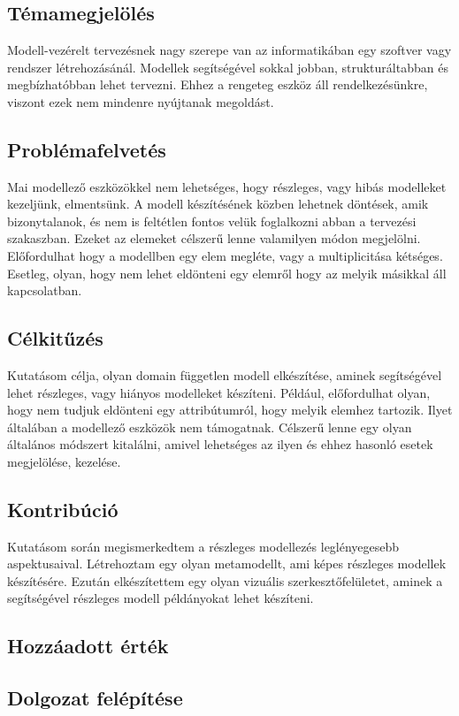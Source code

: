 \chapter{\bevezetes}

\section{Témamegjelölés}
Modell-vezérelt tervezésnek nagy szerepe van az informatikában egy szoftver vagy rendszer létrehozásánál. Modellek segítségével sokkal jobban, strukturáltabban és megbízhatóbban lehet tervezni. Ehhez a rengeteg eszköz áll rendelkezésünkre, viszont ezek nem mindenre nyújtanak megoldást.
\section{Problémafelvetés}
Mai modellező eszközökkel nem lehetséges, hogy részleges, vagy hibás modelleket kezeljünk, elmentsünk. A modell készítésének közben lehetnek döntések, amik bizonytalanok, és nem is feltétlen fontos velük foglalkozni abban a tervezési szakaszban. Ezeket az elemeket célszerű lenne valamilyen módon megjelölni. Előfordulhat hogy a modellben egy elem megléte, vagy a multiplicitása kétséges. Esetleg, olyan, hogy nem lehet eldönteni egy elemről hogy az melyik másikkal áll kapcsolatban.
\section{Célkitűzés}	
Kutatásom célja, olyan domain független modell elkészítése, aminek segítségével lehet részleges, vagy hiányos modelleket készíteni. Például, előfordulhat olyan, hogy nem tudjuk eldönteni egy attribútumról, hogy melyik elemhez tartozik. Ilyet általában a modellező eszközök nem támogatnak. Célszerű lenne egy olyan általános módszert kitalálni, amivel lehetséges az ilyen és ehhez hasonló esetek megjelölése, kezelése.
\section{Kontribúció}
Kutatásom során megismerkedtem a részleges modellezés leglényegesebb aspektusaival. Létrehoztam egy olyan metamodellt, ami képes részleges modellek készítésére. Ezután elkészítettem egy olyan vizuális szerkesztőfelületet, aminek a segítségével részleges modell példányokat lehet készíteni.  

\section{Hozzáadott érték}	

\section{Dolgozat felépítése}

